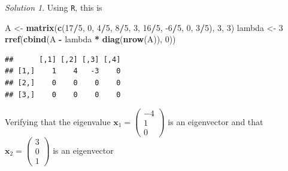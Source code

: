 \documentclass[
]{book}
\newenvironment{Shaded}{\begin{snugshade}}{\end{snugshade}}
\newcommand{\CommentTok}[1]{\textcolor[rgb]{0.56,0.35,0.01}{\textit{#1}}}
\newcommand{\DecValTok}[1]{\textcolor[rgb]{0.00,0.00,0.81}{#1}}
\newcommand{\KeywordTok}[1]{\textcolor[rgb]{0.13,0.29,0.53}{\textbf{#1}}}
\newcommand{\NormalTok}[1]{#1}
\newcommand{\OperatorTok}[1]{\textcolor[rgb]{0.81,0.36,0.00}{\textbf{#1}}}
\newcommand{\StringTok}[1]{\textcolor[rgb]{0.31,0.60,0.02}{#1}}
\theoremstyle{definition}
\theoremstyle{definition}
\theoremstyle{definition}
\theoremstyle{definition}
\theoremstyle{remark}
\newtheorem*{solution}{Solution}
\begin{document}
\begin{solution}
Using \texttt{R}, this is

\begin{Shaded}
\begin{Highlighting}[]
\NormalTok{A <-}\StringTok{ }\KeywordTok{matrix}\NormalTok{(}\KeywordTok{c}\NormalTok{(}\DecValTok{17}\OperatorTok{/}\DecValTok{5}\NormalTok{, }\DecValTok{0}\NormalTok{, }\DecValTok{4}\OperatorTok{/}\DecValTok{5}\NormalTok{, }\DecValTok{8}\OperatorTok{/}\DecValTok{5}\NormalTok{, }\DecValTok{3}\NormalTok{, }\DecValTok{16}\OperatorTok{/}\DecValTok{5}\NormalTok{, }\DecValTok{-6}\OperatorTok{/}\DecValTok{5}\NormalTok{, }\DecValTok{0}\NormalTok{, }\DecValTok{3}\OperatorTok{/}\DecValTok{5}\NormalTok{), }\DecValTok{3}\NormalTok{, }\DecValTok{3}\NormalTok{)}
\NormalTok{lambda <-}\StringTok{ }\DecValTok{3}
\KeywordTok{rref}\NormalTok{(}\KeywordTok{cbind}\NormalTok{(A }\OperatorTok{-}\StringTok{ }\NormalTok{lambda }\OperatorTok{*}\StringTok{ }\KeywordTok{diag}\NormalTok{(}\KeywordTok{nrow}\NormalTok{(A)), }\DecValTok{0}\NormalTok{))}
\end{Highlighting}
\end{Shaded}

\begin{verbatim}
##      [,1] [,2] [,3] [,4]
## [1,]    1    4   -3    0
## [2,]    0    0    0    0
## [3,]    0    0    0    0
\end{verbatim}

Verifying that the eigenvalue \(\mathbf{x}_1 = \begin{pmatrix} -4 \\ 1 \\ 0 \end{pmatrix}\) is an eigenvector and that \(\mathbf{x}_2 = \begin{pmatrix} 3 \\ 0 \\ 1 \end{pmatrix}\) is an eigenvector

\begin{Shaded}
\end{Shaded}


\end{solution}
\end{document}
